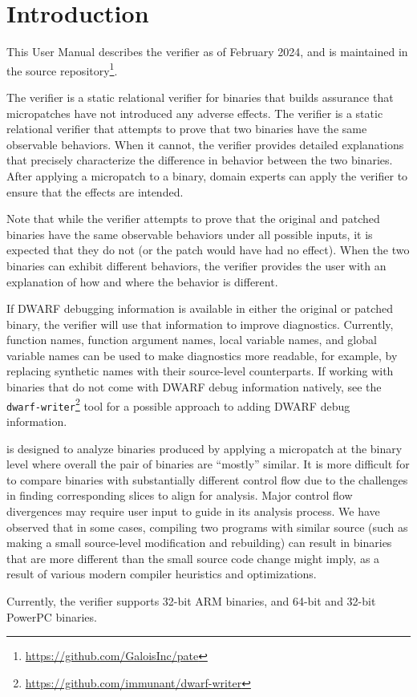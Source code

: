 \section{Introduction}\label{sec:introduction}

This User Manual describes the \pate{} verifier as of February 2024, and is maintained in the \pate{} source repository\footnote{\url{https://github.com/GaloisInc/pate}}.

The \pate{} verifier is a static relational verifier for binaries that builds assurance that micropatches have not introduced any adverse effects.
The verifier is a static relational verifier that attempts to prove that two binaries have the same observable behaviors.
When it cannot, the verifier provides detailed explanations that precisely characterize the difference in behavior between the two binaries.
After applying a micropatch to a binary, domain experts can apply the verifier to ensure that the effects are intended.

Note that while the verifier attempts to prove that the original and patched binaries have the same observable behaviors under all possible inputs, it is expected that they do not (or the patch would have had no effect).
When the two binaries can exhibit different behaviors, the verifier provides the user with an explanation of how and where the behavior is different.

If DWARF debugging information is available in either the original or patched binary, the verifier will use that information to improve diagnostics.
Currently, function names, function argument names, local variable names, and global variable names can be used to make diagnostics more readable, for example, by replacing synthetic names with their source-level counterparts.
If working with binaries that do not come with DWARF debug information natively, see the \lstinline{dwarf-writer}\footnote{\url{https://github.com/immunant/dwarf-writer}} tool for a possible approach to adding DWARF debug information.

\pate{} is designed to analyze binaries produced by applying a micropatch at the binary level where overall the pair of binaries are ``mostly'' similar.
It is more difficult for \pate{} to compare binaries with substantially different control flow due to the challenges in finding corresponding slices to align for analysis.
Major control flow divergences may require user input to guide \pate{} in its analysis process.
We have observed that in some cases, compiling two programs with similar source (such as making a small source-level modification and rebuilding) can result in binaries that are more different than the small source code change might imply, as a result of various modern compiler heuristics and optimizations.

Currently, the verifier supports 32-bit ARM binaries, and 64-bit and 32-bit PowerPC binaries.
